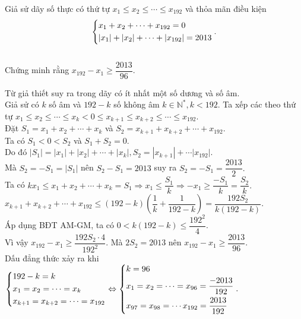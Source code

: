 \begin{ex}%
    Giả sử dãy số thực có thứ tự $x_1 \leq x_2 \leq \cdots \leq x_{192}$ và thỏa mãn điều kiện $$ \left\{\begin{aligned}& x_1+x_2+ \cdots +x_{192}=0\\& |x_1|+|x_2|+ \cdots +|x_{192}|=2013\end{aligned}\right..$$ \\ Chứng minh rằng $x_{192}-x_1 \geq \dfrac{2013}{96}.$
\loigiai
    {
    	Từ giả thiết suy ra trong dãy có ít nhất một số dương và số âm.\\
    	Giả sử có $k$ số âm và $192-k$ số không âm $k \in \mathbb{N^*}, k <192$. Ta xếp các theo thứ tự $x_1 \leq x_2 \leq \cdots \leq x_k <0 \leq x_{k+1} \leq x_{k+2} \leq \cdots \leq x_{192}.$\\
    	Đặt $S_1= x_1+x_2+ \cdots + x_k$ và $S_2=x_{k+1}+x_{k+2}+ \cdots +x_{192}.$\\
    	Ta có $S_1<0<S_2$ và $S_1+S_2=0.$\\
    	Do đó $|S_1|=|x_1|+|x_2|+ \cdots +|x_k|, S_2= |x_{k+1}| +\cdots |x_{192}|.$\\
    	Mà $S_2=-S_1 = |S_1|$ nên $S_2-S_1=2013$ suy ra $S_2=-S_1= \dfrac{2013}{2}.$\\
    	Ta có $kx_1 \leq x_1+x_2+ \cdots +x_k =S_1 \Rightarrow x_1 \leq \dfrac{S_1}{k} \Rightarrow -x_1 \geq \dfrac{-S_1}{k}= \dfrac{S_2}{k}.$ \\
    	$x_{k+1}+x_{k+2}+ \cdots +x_{192} \leq (192-k) \left(\dfrac{1}{k} + \dfrac{1}{192-k} \right)= \dfrac{192S_2}{k(192-k)}.$\\
    	Áp dụng BĐT AM-GM, ta có $0<k(192-k) \leq \dfrac{192^2}{4}.$\\
    	Vì vậy $x_{192}-x_1 \geq \dfrac{192S_2\cdot 4}{192^2}.$ Mà $2S_2=2013$ nên $x_{192}-x_1 \geq \dfrac{2013}{96}.$\\
    	Dấu đẳng thức xảy ra khi $\left\{\begin{aligned}&192-k=k\\&x_1=x_2= \cdots =x_{k}\\ &x_{k+1}=x_{k+2}= \cdots =x_{192}\end{aligned}\right. \Leftrightarrow \left\{\begin{aligned}& k=96\\&x_1=x_2= \cdots =x_{96}= \dfrac{-2013}{192}\\ &x_{97}=x_{98}= \cdots x_{192}=\dfrac{2013}{192}\end{aligned}\right..$ 
    
    }
\end{ex}

